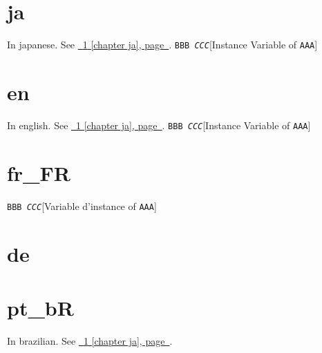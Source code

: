 \documentclass{book}
\begin{document}
\label{anchor:Top}%
%
\chapter{ja}
\label{anchor:chapter-ja}%

In japanese. See \hyperref[anchor:chapter-ja]{\chaptername~\ref*{anchor:chapter-ja} [chapter ja], page~\pageref*{anchor:chapter-ja}}.
\noindent\texttt{BBB \EmbracOn{}\textnormal{\textsl{CCC}}\EmbracOff{}}\hfill[Instance Variable of \texttt{AAA}]



%

%
\chapter{en}
\label{anchor:chapter-en}%

In english. See \hyperref[anchor:chapter-ja]{\chaptername~\ref*{anchor:chapter-ja} [chapter ja], page~\pageref*{anchor:chapter-ja}}.
\noindent\texttt{BBB \EmbracOn{}\textnormal{\textsl{CCC}}\EmbracOff{}}\hfill[Instance Variable of \texttt{AAA}]



%

%
\chapter{fr\_FR}
\label{anchor:chapter-fr_005fFR}%

\noindent\texttt{BBB \EmbracOn{}\textnormal{\textsl{CCC}}\EmbracOff{}}\hfill[Variable d'instance of \texttt{AAA}]



%

%
\chapter{de}
\label{anchor:chapter-de}%

%
\chapter{pt\_bR}
\label{anchor:chapter-pt_005fBR}%

In brazilian. See \hyperref[anchor:chapter-ja]{\chaptername~\ref*{anchor:chapter-ja} [chapter ja], page~\pageref*{anchor:chapter-ja}}.
\end{document}
